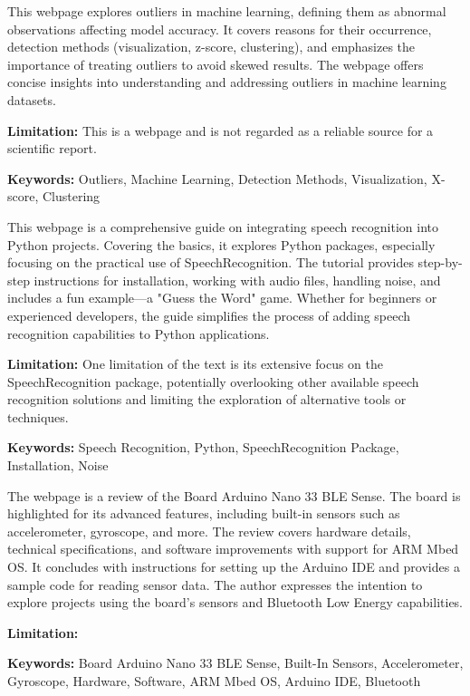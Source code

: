 { 
	
	This webpage \cite{Nichani:2020} explores outliers in machine learning, defining them as abnormal observations affecting model accuracy. It covers reasons for their occurrence, detection methods (visualization, z-score, clustering), and emphasizes the importance of treating outliers to avoid skewed results. The webpage offers concise insights into understanding and addressing outliers in machine learning datasets.
	
	\bigskip
	
	\textbf{Limitation:} This is a webpage and is not regarded as a reliable source for a scientific report.
	
	\scriptsize{\textbf{Keywords:} Outliers, Machine Learning, Detection Methods, Visualization, X-score, Clustering}
}


{ 
	This webpage \cite{Amos:2018} is a comprehensive guide on integrating speech recognition into Python projects. Covering the basics, it explores Python packages, especially focusing on the practical use of SpeechRecognition. The tutorial provides step-by-step instructions for installation, working with audio files, handling noise, and includes a fun example—a "Guess the Word" game. Whether for beginners or experienced developers, the guide simplifies the process of adding speech recognition capabilities to Python applications.
	
	\bigskip
	
	\textbf{Limitation:} One limitation of the text is its extensive focus on the SpeechRecognition package, potentially overlooking other available speech recognition solutions and limiting the exploration of alternative tools or techniques.
	
	\scriptsize{\textbf{Keywords:} Speech Recognition, Python, SpeechRecognition Package, Installation, Noise}
}


{ 
	The webpage \cite{Raj:2019} is a review of the Board Arduino Nano 33 BLE Sense. The board is highlighted for its advanced features, including built-in sensors such as accelerometer, gyroscope, and more. The review covers hardware details, technical specifications, and software improvements with support for ARM Mbed OS. It concludes with instructions for setting up the Arduino IDE and provides a sample code for reading sensor data. The author expresses the intention to explore projects using the board's sensors and Bluetooth Low Energy capabilities.
	
	\bigskip
	
	\textbf{Limitation:} 
	
	\scriptsize{\textbf{Keywords:} Board Arduino Nano 33 BLE Sense, Built-In Sensors, Accelerometer, Gyroscope, Hardware, Software, ARM Mbed OS, Arduino IDE, Bluetooth}
}


